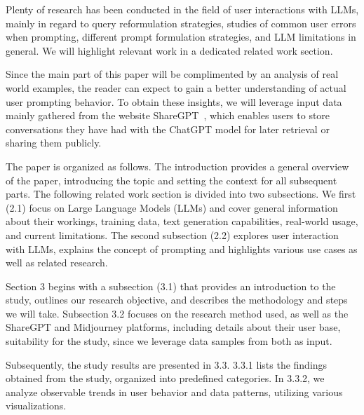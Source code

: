Plenty of research has been conducted in the field of user interactions with LLMs, mainly in
regard to query reformulation strategies, studies of common user errors when prompting,
different prompt formulation strategies, and LLM limitations in general.
We will highlight relevant work in a dedicated related work section. %

Since the main part of this paper will be complimented by an analysis of real world examples, the
reader can expect to gain a better understanding of actual user prompting behavior.
To obtain these insights, we will leverage input data mainly gathered from the website
ShareGPT~\cite{sharegpt_sharegpt_2023}, %
which enables users to store conversations they have had with the ChatGPT model for later retrieval
or sharing them publicly.


The paper is organized as follows.
The introduction %
provides a general overview of the paper, introducing the topic and setting the context for all
subsequent parts.
The following related work section %
is divided into two subsections.
We first (2.1) focus on Large Language Models (LLMs) and cover general information about their
workings, training data, text generation capabilities, real-world usage, and current limitations.
The second subsection (2.2) explores user interaction with LLMs, explains the concept of
prompting and highlights various use cases as well as related research.

Section 3 begins with a subsection (3.1) that provides an introduction to the study, outlines
our research objective, and describes the methodology and steps we will take.
Subsection 3.2 focuses on the research method used, as well as the ShareGPT and
Midjourney platforms, including details about their user base, suitability for the study, since
we leverage data samples from both as input.

Subsequently, the study results are presented in 3.3.
3.3.1 lists the findings obtained from the study, organized into predefined categories. %
In 3.3.2, we analyze observable trends in user behavior and data patterns, utilizing
various visualizations.

